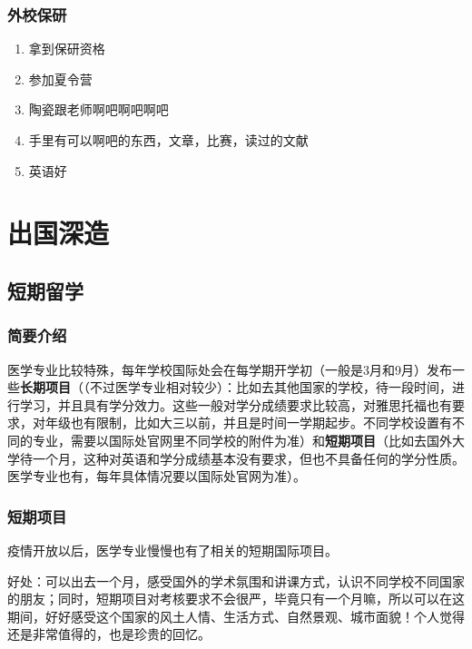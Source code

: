 \documentclass[zihao=-4,fontset=none]{Beautybook-CN}
\begin{document}
\subsection{外校保研}
\begin{enumerate}
\item 拿到保研资格
\item 参加夏令营
\item 陶瓷跟老师啊吧啊吧啊吧
\item 手里有可以啊吧的东西，文章，比赛，读过的文献
\item 英语好
\end{enumerate}
\chapter{出国深造}
\section{短期留学}

\subsection{简要介绍}

医学专业比较特殊，每年学校国际处会在每学期开学初（一般是3月和9月）发布一些\textbf{长期项目}（（不过医学专业相对较少）：比如去其他国家的学校，待一段时间，进行学习，并且具有学分效力。这些一般对学分成绩要求比较高，对雅思托福也有要求，对年级也有限制，比如大三以前，并且是时间一学期起步。不同学校设置有不同的专业，需要以国际处官网里不同学校的附件为准）和\textbf{短期项目}（比如去国外大学待一个月，这种对英语和学分成绩基本没有要求，但也不具备任何的学分性质。医学专业也有，每年具体情况要以国际处官网为准）。

\subsection{短期项目}
疫情开放以后，医学专业慢慢也有了相关的短期国际项目。

好处：可以出去一个月，感受国外的学术氛围和讲课方式，认识不同学校不同国家的朋友；同时，短期项目对考核要求不会很严，毕竟只有一个月嘛，所以可以在这期间，好好感受这个国家的风土人情、生活方式、自然景观、城市面貌！个人觉得还是非常值得的，也是珍贵的回忆。
\end{document}

